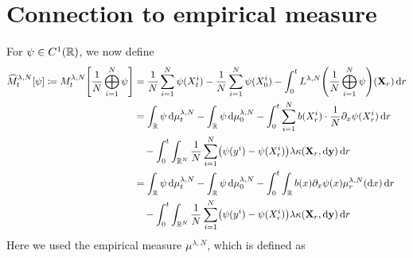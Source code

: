 \section{Connection to empirical measure}

\noindent For \(\psi \in C^1(\mathbb{R})\), we now define
\begin{equation}\label{eq:hat-M-derivation-start}
  \begin{split}
    \widehat{M}_t^{\lambda, N}[\psi] \coloneqq
    M_t^{\lambda, N}\sbr*{\frac{1}{N} \bigoplus_{i=1}^N \psi}
     & = \frac{1}{N} \sum_{i=1}^N \psi(X_t^i) - \frac{1}{N} \sum_{i=1}^N \psi(X_0^i) - \int_0^t L^{\lambda, N} \br*{\frac{1}{N}\bigoplus_{i=1}^N \psi} (\bm{X}_r) \odif{r} \\
     & = \int_\potspace \psi \odif{\mu_t^{\lambda, N}} - \int_\potspace \psi \odif{\mu_0^{\lambda, N}}
    - \int_0^t \sum_{i=1}^N b(X_{r}^i) \cdot \frac{1}{N} \partial_{x} \psi(X_{r}^i) \odif{r}                                                                               \\
     & \quad - \int_0^t \int_{\potspace^N} \frac{1}{N} \sum_{i=1}^N \br*{ \psi(y^i) - \psi(X_{r}^i) } \lambda \kappa(\bm{X}_r, \odif{\bm{y}}) \odif{r}                     \\
     & = \int_\potspace \psi \odif{\mu_t^{\lambda, N}} - \int_\potspace \psi \odif{\mu_0^{\lambda, N}}
    - \int_0^t \int_\potspace b(x) \partial_{x} \psi(x) \mu_r^{\lambda, N}(\odif{x}) \odif{r}                                                                              \\
     & \quad - \int_0^t \int_{\potspace^N} \frac{1}{N} \sum_{i=1}^N \br*{ \psi(y^i) - \psi(X_{r}^i) } \lambda \kappa(\bm{X}_r, \odif{\bm{y}}) \odif{r}                     \\
  \end{split}
\end{equation}
Here we used the empirical measure $\mu^{\lambda,N}$, which is defined as
